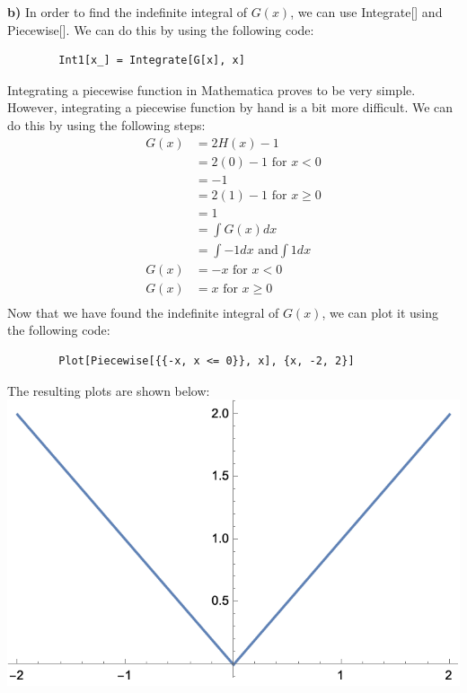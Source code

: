 \documentclass{article}
\begin{document}
    \textbf{b)} In order to find the indefinite integral of $G(x)$, we can use Integrate[] and Piecewise[]. We can do this by using the following code: \\
    \begin{verbatim}
        Int1[x_] = Integrate[G[x], x]
    \end{verbatim}
    Integrating a piecewise function in Mathematica proves to be very simple. However, integrating a piecewise function by hand is a bit more difficult. We can do this by using the following steps: \\
    \begin{equation*}
        \begin{split}
            G(x) &= 2H(x)-1 \\
            &= 2(0)-1 \text{ for } x < 0 \\
            &= -1 \\
            &= 2(1)-1 \text{ for } x \geq 0 \\
            &= 1 \\
            &= \int G(x) dx \\
            &= \int -1 dx \text{ and}  \int 1 dx \\
        G(x)&= -x \text{ for } x < 0 \\
        G(x)&= x \text{ for } x \geq 0 \\
        \end{split}
    \end{equation*}
    Now that we have found the indefinite integral of $G(x)$, we can plot it using the following code: \\
    \begin{verbatim}
        Plot[Piecewise[{{-x, x <= 0}}, x], {x, -2, 2}]
    \end{verbatim}
    The resulting plots are shown below: \\
    \includegraphics[scale=0.5]{2.2.2b.png} \\
\end{document}

